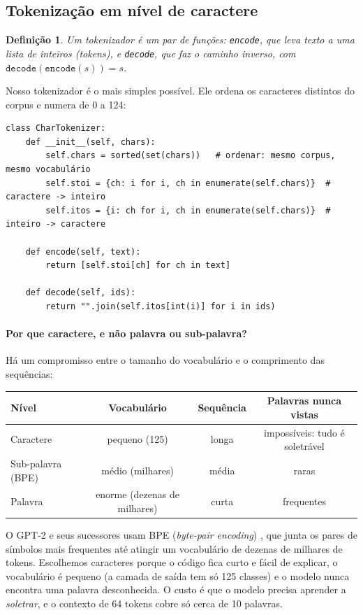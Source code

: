 \documentclass[11pt,a4paper]{article}
\newtheorem{definicao}{Definição}
\begin{document}
\subsection{Tokenização em nível de caractere}

\begin{definicao}
Um \emph{tokenizador} é um par de funções: \texttt{encode}, que leva texto a uma lista de inteiros (tokens), e \texttt{decode}, que faz o caminho inverso, com $\texttt{decode}(\texttt{encode}(s)) = s$.
\end{definicao}

Nosso tokenizador é o mais simples possível. Ele ordena os caracteres distintos do corpus e numera de 0 a 124:

\begin{lstlisting}
class CharTokenizer:
    def __init__(self, chars):
        self.chars = sorted(set(chars))   # ordenar: mesmo corpus, mesmo vocabulário
        self.stoi = {ch: i for i, ch in enumerate(self.chars)}  # caractere -> inteiro
        self.itos = {i: ch for i, ch in enumerate(self.chars)}  # inteiro -> caractere

    def encode(self, text):
        return [self.stoi[ch] for ch in text]

    def decode(self, ids):
        return "".join(self.itos[int(i)] for i in ids)
\end{lstlisting}

\paragraph{Por que caractere, e não palavra ou sub-palavra?} Há um compromisso entre o tamanho do vocabulário e o comprimento das sequências:

\begin{center}
\begin{tabular}{@{}lccc@{}}
\toprule
Nível & Vocabulário & Sequência & Palavras nunca vistas \\
\midrule
Caractere & pequeno (125) & longa & impossíveis: tudo é soletrável \\
Sub-palavra (BPE) & médio (milhares) & média & raras \\
Palavra & enorme (dezenas de milhares) & curta & frequentes \\
\bottomrule
\end{tabular}
\end{center}

O GPT-2 e seus sucessores usam BPE (\emph{byte-pair encoding}) \cite{sennrich}, que junta os pares de símbolos mais frequentes até atingir um vocabulário de dezenas de milhares de tokens. Escolhemos caracteres porque o código fica curto e fácil de explicar, o vocabulário é pequeno (a camada de saída tem só 125 classes) e o modelo nunca encontra uma palavra desconhecida. O custo é que o modelo precisa aprender a \emph{soletrar}, e o contexto de 64 tokens cobre só cerca de 10 palavras.
\end{document}
